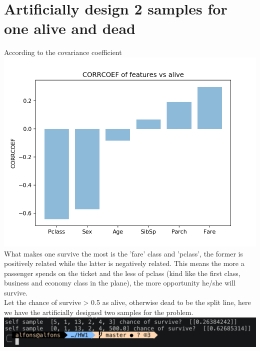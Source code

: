 \documentclass[11pt, a4paper]{article} %
\begin{document}
\section{Artificially design 2 samples for one alive and dead}
According to the covariance coefficient
\\ \includegraphics[scale = 0.7]{figure_2/CORRCOEF.png}
\\ What makes one survive the most is the 'fare' class and 'pclass', the former is positively related while the latter is negatively related. This means the more a passenger spends on the ticket and the less of pclass (kind like the first class, business and economy class in the plane), the more opportunity he/she will survive.
\\ Let the chance of survive > 0.5 as alive, otherwise dead to be the split line, here we have the artificially designed two samples for the problem.
\\ \includegraphics[scale = 0.5]{figure_2/survive.png}
\end{document}
